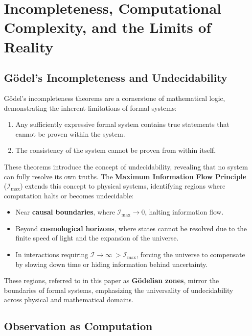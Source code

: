 \documentclass[12pt]{article}
\begin{document}
\section{Incompleteness, Computational Complexity, and the Limits of Reality}

\subsection{Gödel’s Incompleteness and Undecidability}

Gödel’s incompleteness theorems are a cornerstone of mathematical logic, demonstrating the inherent limitations of formal systems:
\begin{enumerate}
    \item Any sufficiently expressive formal system contains true statements that cannot be proven within the system.
    \item The consistency of the system cannot be proven from within itself.
\end{enumerate}

These theorems introduce the concept of undecidability, revealing that no system can fully resolve its own truths. The \textbf{Maximum Information Flow Principle} (\(\mathcal{I}_{\text{max}}\)) extends this concept to physical systems, identifying regions where computation halts or becomes undecidable:
\begin{itemize}
    \item Near \textbf{causal boundaries}, where \(\mathcal{I}_{\text{max}} \to 0\), halting information flow.
    \item Beyond \textbf{cosmological horizons}, where states cannot be resolved due to the finite speed of light and the expansion of the universe.
    \item In interactions requiring \(\mathcal{I} \to \infty\ > \mathcal{I}_{\text{max}}\), forcing the universe to compensate by slowing down time or hiding information behind uncertainty.
\end{itemize}

These regions, referred to in this paper as \textbf{Gödelian zones}, mirror the boundaries of formal systems, emphasizing the universality of undecidability across physical and mathematical domains.

\subsection{Observation as Computation}
\end{document}
